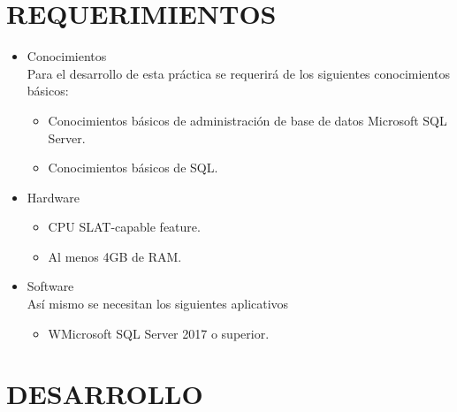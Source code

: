 \documentclass[12pt,letterpaper]{article}
\begin{document}
    \section{REQUERIMIENTOS}
    \begin{itemize}
        \item Conocimientos\\
        Para el desarrollo de esta práctica se requerirá de los siguientes conocimientos básicos:
        \begin{itemize} 
            \item Conocimientos básicos de administración de base de datos Microsoft SQL Server.
            \item Conocimientos básicos de SQL.
        \end{itemize}
        \item Hardware
        \begin{itemize}
            \item CPU SLAT-capable feature.
            \item Al menos 4GB de RAM.
        \end{itemize}
        \item Software\\
        Así mismo se necesitan los siguientes aplicativos
        \begin{itemize}
            \item WMicrosoft SQL Server 2017 o superior.
        \end{itemize}
    \end{itemize}

    \newpage
    \section{DESARROLLO}
\end{document}
